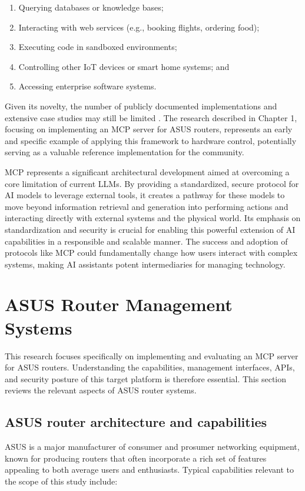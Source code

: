 \begin{enumerate}
\item Querying databases or knowledge bases;
\item Interacting with web services (e.g., booking flights, ordering food);
\item Executing code in sandboxed environments;
\item Controlling other IoT devices or smart home systems; and
\item Accessing enterprise software systems.
\end{enumerate}

Given its novelty, the number of publicly documented implementations and extensive case studies may still be limited \cite{mcp_wandb}. The research described in Chapter 1, focusing on implementing an MCP server for ASUS routers, represents an early and specific example of applying this framework to hardware control, potentially serving as a valuable reference implementation for the community.

MCP represents a significant architectural development aimed at overcoming a core limitation of current LLMs. By providing a standardized, secure protocol for AI models to leverage external tools, it creates a pathway for these models to move beyond information retrieval and generation into performing actions and interacting directly with external systems and the physical world. Its emphasis on standardization and security is crucial for enabling this powerful extension of AI capabilities in a responsible and scalable manner. The success and adoption of protocols like MCP could fundamentally change how users interact with complex systems, making AI assistants potent intermediaries for managing technology.

\section{ASUS Router Management Systems}
This research focuses specifically on implementing and evaluating an MCP server for ASUS routers. Understanding the capabilities, management interfaces, APIs, and security posture of this target platform is therefore essential. This section reviews the relevant aspects of ASUS router systems.

\subsection{ASUS router architecture and capabilities}
ASUS is a major manufacturer of consumer and prosumer networking equipment, known for producing routers that often incorporate a rich set of features appealing to both average users and enthusiasts. Typical capabilities relevant to the scope of this study include:

